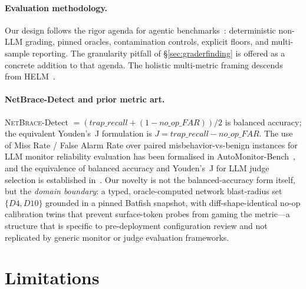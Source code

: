 \documentclass[11pt]{article}
\newcommand{\netbrace}{\textsc{NetBrace}}
\begin{document}
\paragraph{Evaluation methodology.} Our design follows the rigor agenda for
agentic benchmarks~\cite{abc}: deterministic non-LLM grading, pinned
oracles, contamination controls, explicit floors, and multi-sample
reporting. The granularity pitfall of \S\ref{sec:graderfinding} is offered
as a concrete addition to that agenda. The holistic multi-metric framing
descends from HELM~\cite{helm}.

\paragraph{NetBrace-Detect and prior metric art.} \netbrace{}-Detect
$= (\textit{trap\_recall} + (1 - \textit{no\_op\_FAR}))/2$ is balanced
accuracy; the equivalent Youden's~J formulation is
$J = \textit{trap\_recall} - \textit{no\_op\_FAR}$. The use of Miss Rate
/ False Alarm Rate over paired misbehavior-vs-benign instances for LLM
monitor reliability evaluation has been formalised in
AutoMonitor-Bench~\cite{automonitorbench}, and the equivalence of balanced
accuracy and Youden's~J for LLM judge selection is established
in~\cite{balancedaccyouden}. Our novelty is not the balanced-accuracy form
itself, but the \emph{domain boundary}: a typed, oracle-computed network
blast-radius set $\{D4, D10\}$ grounded in a pinned Batfish snapshot, with
diff-shape-identical no-op calibration twins that prevent surface-token
probes from gaming the metric---a structure that is specific to
pre-deployment configuration review and not replicated by generic monitor
or judge evaluation frameworks.

\section{Limitations}
\label{sec:limitations}
\end{document}
